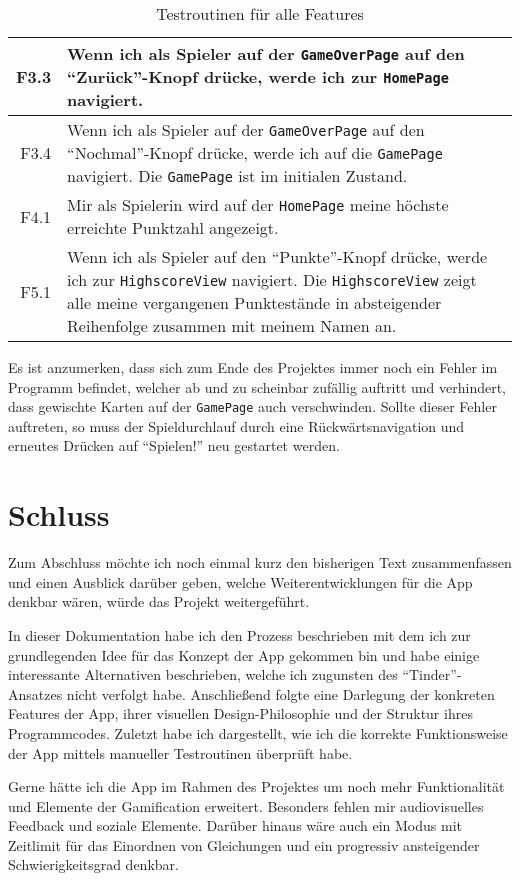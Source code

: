 \begin{table}
\begin{longtabu}{| >{\ttfamily} r | X |}
    \hline
    F3.3 & Wenn ich als Spieler auf der \texttt{GameOverPage} auf den \enquote{Zurück}-Knopf drücke, werde ich zur \texttt{HomePage} navigiert.\\
    \hline
    F3.4 & Wenn ich als Spieler auf der \texttt{GameOverPage} auf den \enquote{Nochmal}-Knopf drücke, werde ich auf die \texttt{GamePage} navigiert. Die \texttt{GamePage} ist im initialen Zustand.\\
    \hline
    F4.1 & Mir als Spielerin wird auf der \texttt{HomePage} meine höchste erreichte Punktzahl angezeigt.\\
    \hline
    F5.1 & Wenn ich als Spieler auf den \enquote{Punkte}-Knopf drücke, werde ich zur \texttt{HighscoreView} navigiert. Die \texttt{HighscoreView} zeigt alle meine vergangenen Punktestände in absteigender Reihenfolge zusammen mit meinem Namen an.\\
    \hline
  \end{longtabu}
  \caption{Testroutinen für alle Features}\label{tab:test-routines}
\end{table}

Es ist anzumerken, dass sich zum Ende des Projektes immer noch ein Fehler im Programm befindet, welcher ab und zu scheinbar zufällig auftritt und verhindert, dass gewischte Karten auf der \texttt{GamePage} auch verschwinden.
Sollte dieser Fehler auftreten, so muss der Spieldurchlauf durch eine Rückwärtsnavigation und erneutes Drücken auf \enquote{Spielen!} neu gestartet werden.

\section{Schluss}

Zum Abschluss möchte ich noch einmal kurz den bisherigen Text zusammenfassen und einen Ausblick darüber geben, welche Weiterentwicklungen für die App denkbar wären, würde das Projekt weitergeführt.

In dieser Dokumentation habe ich den Prozess beschrieben mit dem ich zur grundlegenden Idee für das Konzept der App gekommen bin und habe einige interessante Alternativen beschrieben, welche ich zugunsten des \enquote{Tinder}-Ansatzes nicht verfolgt habe.
Anschließend folgte eine Darlegung der konkreten Features der App, ihrer visuellen Design-Philosophie und der Struktur ihres Programmcodes.
Zuletzt habe ich dargestellt, wie ich die korrekte Funktionsweise der App mittels manueller Testroutinen überprüft habe.

Gerne hätte ich die App im Rahmen des Projektes um noch mehr Funktionalität und Elemente der Gamification erweitert.
Besonders fehlen mir audiovisuelles Feedback und soziale Elemente.
Darüber hinaus wäre auch ein Modus mit Zeitlimit für das Einordnen von Gleichungen und ein progressiv ansteigender Schwierigkeitsgrad denkbar.

